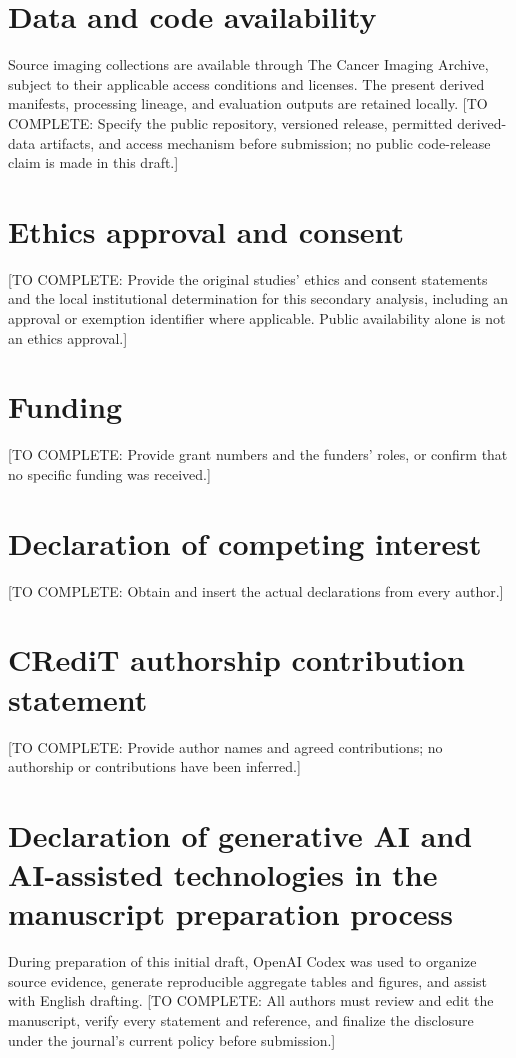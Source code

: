 \documentclass[5p,twocolumn,authoryear]{elsarticle}
\newcommand{\todo}[1]{\textcolor{red!70!black}{[TO COMPLETE: #1]}}
\begin{document}
\section*{Data and code availability}
Source imaging collections are available through The Cancer Imaging Archive, subject to their applicable access conditions and licenses. The present derived manifests, processing lineage, and evaluation outputs are retained locally. \todo{Specify the public repository, versioned release, permitted derived-data artifacts, and access mechanism before submission; no public code-release claim is made in this draft.}
\section*{Ethics approval and consent}
\todo{Provide the original studies' ethics and consent statements and the local institutional determination for this secondary analysis, including an approval or exemption identifier where applicable. Public availability alone is not an ethics approval.}
\section*{Funding}
\todo{Provide grant numbers and the funders' roles, or confirm that no specific funding was received.}
\section*{Declaration of competing interest}
\todo{Obtain and insert the actual declarations from every author.}
\section*{CRediT authorship contribution statement}
\todo{Provide author names and agreed contributions; no authorship or contributions have been inferred.}
\section*{Declaration of generative AI and AI-assisted technologies in the manuscript preparation process}
During preparation of this initial draft, OpenAI Codex was used to organize source evidence, generate reproducible aggregate tables and figures, and assist with English drafting. \todo{All authors must review and edit the manuscript, verify every statement and reference, and finalize the disclosure under the journal's current policy before submission.}
\clearpage
\appendix

\clearpage


\end{document}
